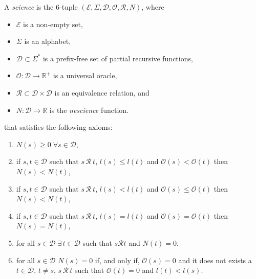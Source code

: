 \begin{definition}

A \emph{science} is the 6-tuple $\left( \mathcal{E}, \Sigma, \mathcal{D}, \mathcal{O}, \mathcal{R}, N \right)$, where

\begin{itemize}
\item $\mathcal{E}$ is a non-empty set,
\item $\Sigma$ is an alphabet,
\item $\mathcal{D} \subset \Sigma^\ast$ is a prefix-free set of partial recursive functions,
\item $\mathcal{O} : \mathcal{D} \rightarrow \mathbb{R}^+$ is a universal oracle,
\item $\mathcal{R} \subset \mathcal{D} \times \mathcal{D}$ is an equivalence relation, and
\item $N : \mathcal{D} \rightarrow \mathbb{R}$ is the \emph{nescience} function.
\end{itemize}

\smallskip

that satisfies the following axioms:

\smallskip

\begin{enumerate}[label=(\roman*)]

\item $N(s) \geq 0 \; \forall s \in \mathcal{D}$,

\item if $s, t \in \mathcal{D}$ such that $s \, \mathcal{R} \, t$, $l(s) \leq l(t)$ and $\mathcal{O} (s) < \mathcal{O} (t)$ then $N(s) < N(t)$,

\item if $s, t \in \mathcal{D}$ such that $s \, \mathcal{R} \, t$, $l(s) < l(t)$ and $\mathcal{O} (s) \leq \mathcal{O} (t)$ then $N(s) < N(t)$,

\item if $s, t \in \mathcal{D}$ such that $s \, \mathcal{R} \, t$, $l(s) = l(t)$ and $\mathcal{O} (s) = \mathcal{O} (t)$ then $N(s) = N(t)$,

\item for all $s \in \mathcal{D} \; \exists \, t \in \mathcal{D}$ such that $s \mathcal{R} t$ and $N(t) = 0$.

\item for all $s \in \mathcal{D}$ $N(s) = 0$  if, and only if, $\mathcal{O} (s) = 0$
and it does not exists a $t \in \mathcal{D}$, $t \neq s$, $s \, \mathcal{R} \, t$  such that $\mathcal{O} (t) = 0$ and $l(t) < l(s)$.

\end{enumerate}

\end{definition}

